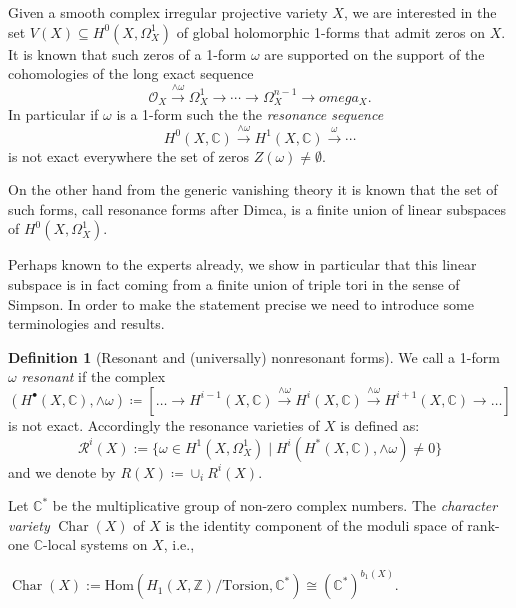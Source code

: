 \documentclass[a4paper,12pt,reqno]{amsart}
\title{}
\date{\today}
\newcommand{\C}{\mathbb{C}}
\newcommand{\Hom}{\mathrm{Hom}}
\theoremstyle{plain}
\theoremstyle{definition}
\newtheorem{definition}[theorem]{Definition}
\theoremstyle{remark}
\DeclareMathOperator{\Char}{Char}
\def\bC{\mathbb{C}}
\def\bZ{\mathbb{Z}}
\newcommand{\sO}{\mathcal{O}}
\newcommand{\sR}{\mathcal{R}}
\newcommand{\bbC}{\mathbb{C}}
\begin{document}
\maketitle


\section{}


Given a smooth complex irregular projective variety $X$, we are interested in the set $V(X)\subseteq H^0(X, \Omega_X^1)$ of global holomorphic 1-forms
that admit zeros on $X$. It is known that such zeros of a 1-form $\omega$ 
are supported on the support of the cohomologies of the long exact sequence
\[\sO_X\overset{\wedge\omega}{\to} \Omega_X^1 \to \cdots\to \Omega_X^{n-1}\to omega_X.\]
In particular if $\omega$ is a 1-form such the the \textit{resonance sequence}
\[H^0(X,\bbC)\overset{\wedge\omega}{\to}H^1(X,\bbC)\overset{\omega}{\to}\cdots\]
is not exact everywhere the set of zeros $Z(\omega)\neq \emptyset$.

On the other hand from the generic vanishing theory it is known that the set of such forms, call resonance forms after Dimca,
is a finite union of linear subspaces of $H^0(X,\Omega_X^1)$.

Perhaps known to the experts already, we show in particular that this linear subspace is in fact coming from a 
finite union of triple
tori in the sense of Simpson. In order to make the statement precise we need to introduce some terminologies and results. 
\begin{definition}[Resonant and (universally) nonresonant forms]\label{def:resonance}
We call a 1-form $\omega$ \emph{resonant} if the complex 
\[(H^{\bullet}(X,\bbC), \wedge\omega)\coloneqq [\ldots\to H^{i-1}(X,\C)\overset{\wedge\omega}{\longrightarrow}H^{i}(X,\C)\overset{\wedge\omega}{\longrightarrow}H^{i+1}(X,\C)\to\ldots]\]
 is not exact. Accordingly the resonance varieties of $X$ is defined as:
$$ \sR^i(X):= \{\omega\in H^1(X,\Omega_X^1)\mid  H^i  (H^*(X,\bbC), \wedge \omega) \neq 0 \} $$
and we denote by $R(X) \coloneqq \cup_i R^i(X)$.
\end{definition}


Let $\C^{\ast}$ be the multiplicative group of non-zero complex numbers.
The {\it character variety} $\Char(X)$ of $X$ is the identity component of the moduli space of rank-one $\bC$-local systems on $X$, i.e., 
\begin{center}
$\Char(X):= 
\Hom (H_1(X,\bZ)/\text{Torsion}, \bC^*)\cong (\bC^*)^{b_1(X)}.$
\end{center}
\end{document}
